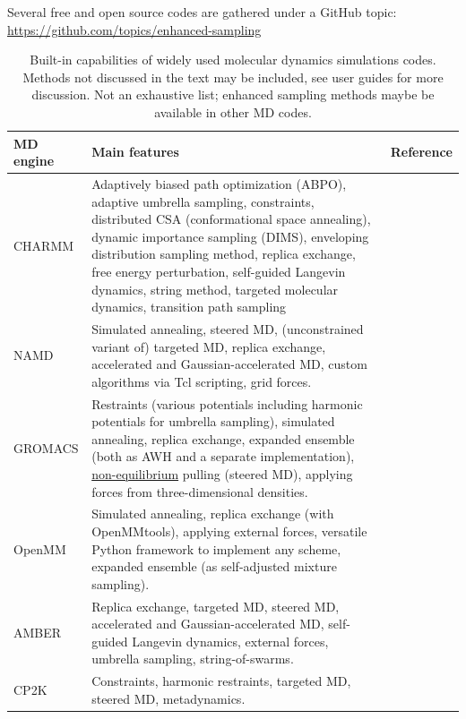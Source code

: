 \documentclass[9pt,review]{livecoms}
\begin{document}
Several free and open source codes are gathered under a GitHub topic: \url{https://github.com/topics/enhanced-sampling}

\begin{table}[!ht]
\caption {Built-in capabilities of widely used molecular dynamics simulations codes. Methods not discussed in the text may be included, see user guides for more discussion. Not an exhaustive list; enhanced sampling methods maybe be available in other MD codes.}
\label{Table:Codes}
\begin{tabularx}{0.95\textwidth}{
  || >{\raggedright\arraybackslash} l
  || >{\raggedright\arraybackslash}X
  | >{\raggedright\arraybackslash}l ||}
 \hline
  MD engine  & Main features                                 & Reference \\
\hline
\hline
CHARMM & Adaptively biased path optimization (ABPO), adaptive umbrella sampling, constraints, distributed CSA (conformational space annealing), dynamic importance sampling (DIMS), enveloping distribution sampling method, replica exchange, free energy perturbation, self-guided Langevin dynamics, string method, targeted molecular dynamics, transition path sampling & \cite{Brooks2009} \\
\hline
NAMD &  Simulated annealing, steered MD, (unconstrained variant of) targeted MD, replica exchange, accelerated and Gaussian-accelerated MD, custom algorithms via Tcl scripting, grid forces.        & \cite{Phillips2020} \\
\hline
GROMACS & Restraints (various potentials including harmonic potentials for umbrella sampling), simulated annealing, replica exchange, expanded ensemble (both as AWH and a separate implementation), \hyperlink{ref:OutOfEq} {non-equilibrium} pulling (steered MD), applying forces from three-dimensional densities.   &  \cite{lindahl_2021}\\
\hline
OpenMM & Simulated annealing, replica exchange (with OpenMMtools), applying external forces, versatile Python framework to implement any scheme, expanded ensemble (as self-adjusted mixture sampling). & \cite{10.1371/journal.pcbi.1005659}\\
\hline
AMBER  &  Replica exchange, targeted MD, steered MD, accelerated and Gaussian-accelerated MD, self-guided Langevin dynamics, external forces, umbrella sampling, string-of-swarms. & \cite{Case_2021} \\
\hline
CP2K & Constraints, harmonic restraints, targeted MD, steered MD, metadynamics. & \cite{CP2K_2020} \\
\hline

\end{tabularx}
\end{table}
\end{document}
